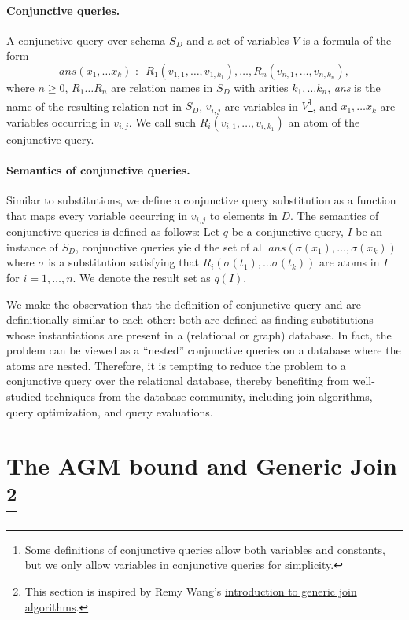 \paragraph{Conjunctive queries.}
A conjunctive query over schema $S_D$ and a set of variables $V$ is a formula of the form
\[
    \textit{ans}(x_1,\ldots x_k)\textit{ :- } R_1(v_{1,1},\ldots,v_{1,k_1}),\ldots, R_n(v_{n,1},\ldots,v_{n,k_n}),
\]
where $n\geq 0$, $R_1\ldots R_n$ are relation names in $S_D$ with arities $k_1,\ldots k_n$, \textit{ans} is the name of the resulting relation not in $S_D$, $v_{i,j}$ are variables in $V$\footnote{Some definitions of conjunctive queries allow both variables and constants, but we only allow variables in conjunctive queries for simplicity.}, and $x_1,\ldots x_k$ are variables occurring in $v_{i,j}$. We call such $R_i(v_{i,1},\ldots,v_{i,k_1})$ an atom of the conjunctive query.

\paragraph{Semantics of conjunctive queries.} 
Similar to \ematching substitutions, we define a conjunctive query substitution as a function that maps every variable occurring in $v_{i,j}$ to elements in $D$. The semantics of conjunctive queries is defined as follows: Let $q$ be a conjunctive query, $I$ be an instance of $S_D$, conjunctive queries yield the set of all $\textit{ans}(\sigma(x_1),\ldots,\sigma(x_k))$ where $\sigma$ is a substitution satisfying that $R_i(\sigma(t_1),\ldots \sigma(t_k))$ are atoms in $I$ for $i=1,\ldots,n$. We denote the result set as $q(I)$.

We make the observation that the definition of conjunctive query and \ematching
are definitionally similar to each other: both are defined as finding
substitutions whose instantiations are present in a (relational or graph)
database. In fact, the \ematching problem can be viewed as a ``nested''
conjunctive queries on a database where the atoms are nested. Therefore, it is
tempting to reduce the \ematching problem to a conjunctive query over the
relational database, thereby benefiting from well-studied techniques from the
database community, including join algorithms, query optimization, and query
evaluations.

\section[The AGM bound]{The AGM bound and Generic Join \footnote{This section is inspired by Remy Wang's \href{https://gitlab.com/remywang/blog/-/blob/master/posts/wcoj.md}{introduction to generic join algorithms}.}}

